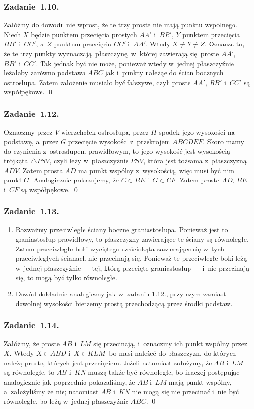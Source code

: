 \subsubsection*{Zadanie~1.10.}
Załóżmy do dowodu nie wprost, że te trzy proste nie mają punktu wspólnego. Niech \(X\) będzie punktem przecięcia prostych \(AA'\) i~\(BB'\), \(Y\) punktem przecięcia \(BB'\) i~\(CC'\), a~\(Z\) punktem przecięcia \(CC'\) i~\(AA'\). Wtedy \(X \neq Y \neq Z\). Oznacza to, że te trzy punkty wyznaczają płaszczynę, w~której zawierają się proste \(AA'\), \(BB'\) i~\(CC'\). Tak jednak być nie może, ponieważ wtedy w~jednej płaszczyźnie leżałaby zarówno podstawa \(ABC\) jak i~punkty należąe do ścian bocznych ostrosłupa. Zatem założenie musiało być fałszywe, czyli proste \(AA'\), \(BB'\) i~\(CC'\) są współpękowe.
\qed
\subsubsection*{Zadanie~1.12.}
Oznaczmy przez \(V\) wierzchołek ostrosłupa, przez \(H\) spodek jego wysokości na podstawę, a~przez \(G\) przecięcie wysokości z~przekrojem \(ABCDEF\). Skoro mamy do czynienia z~ostrosłupem prawidłowym, to jego wysokość jest wysokością trójkąta \(\triangle{PSV}\), czyli leży w~płaszczyźnie \(PSV\), która jest tożsama z~płaszczyzną \(ADV\). Zatem prosta \(AD\) ma punkt wspólny z~wysokością, więc musi być nim punkt \(G\). Analogicznie pokazujemy, że \(G \in BE\) i~\(G \in CF\). Zatem proste \(AD\), \(BE\) i~\(CF\) są współpękowe.
\qed
\subsubsection*{Zadanie~1.13.}
\begin{enumerate}[label={\alph*)}]
    \item Rozważmy przeciwległe ściany boczne graniastosłupa. Ponieważ jest to graniastosłup prawidłowy, to płaszczyzny zawierające te ściany są równoległe. Zatem przeciwległe boki wyciętego sześciokąta zawierające się w~tych przeciwległych ścianach nie przecinają się. Ponieważ te przeciwległe boki leżą w~jednej płaszczyźnie --- tej, którą przecięto graniastosłup --- i~nie przecinają się, to mogą być tylko równoległe.
    \item Dowód dokładnie analogiczny jak w~zadaniu 1.12., przy czym zamiast dowolnej wysokości bierzemy prostą przechodzącą przez środki podstaw.
\end{enumerate}
\subsubsection*{Zadanie~1.14.}
Załóżmy, że proste \(AB\) i~\(LM\) się przecinają, i~oznaczmy ich punkt wspólny przez \(X\). Wtedy \(X \in ABD\) i~\(X \in KLM\), bo musi należeć do płaszczyzn, do których należą proste, których jest przecięciem. Jeżeli natomiast założymy, że \(AB\) i~\(LM\) są równoległe, to \(AB\) i~\(KN\) muszą także być równoległe, bo inaczej postępując analogicznie jak poprzednio pokazaliśmy, że \(AB\) i~\(LM\) mają punkt wspólny, a~założyliśmy że nie; natomiast \(AB\) i~\(KN\) nie mogą się nie przecinać i~nie być równoległe, bo leżą w~jednej płaszczyźnie \(ABC\).
\qed

